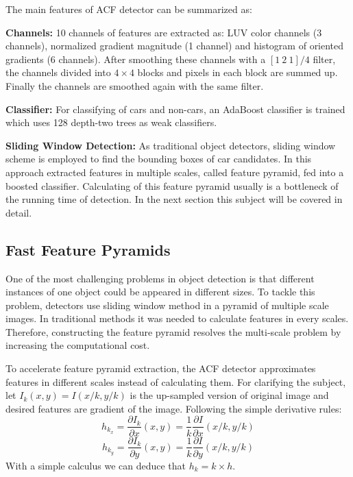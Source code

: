 \documentclass[conference]{IEEEtran}
\begin{document}
The main features of ACF detector can be summarized as:

\textbf{Channels:} 
 10 channels of features are extracted as: LUV color channels (3 channels), normalized gradient magnitude (1 channel) and histogram of oriented gradients (6 channels). After smoothing these channels with a 
$[1\ 2\ 1]/4$ filter, 
the channels divided into $4 \times 4$ blocks and pixels in each block are summed up. Finally the channels are smoothed again with the same filter.

\textbf{Classifier:} For classifying of cars and non-cars, an AdaBoost classifier \cite{friedman2000additive} is trained which uses 128 depth-two trees as weak classifiers.

\textbf{Sliding Window Detection:} As traditional object detectors, sliding window scheme is employed to find the bounding boxes of car candidates. In this approach extracted features in multiple scales, called feature pyramid, fed into a boosted classifier. Calculating of this feature pyramid usually is a bottleneck of the running time of detection. In the next section this subject will be covered in detail.

\subsection{Fast Feature Pyramids}
One of the most challenging problems in object detection is that different instances of one object could be appeared in different sizes. To tackle this problem, detectors use sliding window method in a pyramid of multiple scale images. In traditional methods it was needed to calculate features in every scales. Therefore, constructing the feature pyramid  resolves the multi-scale problem by increasing the computational cost.

 To accelerate feature pyramid extraction, the ACF detector approximates features in different scales instead of calculating them. For clarifying the subject, let $I_{k}(x,y)=I(x/k,y/k)$ is the up-sampled version of original image and desired features are gradient of the image. Following the simple derivative rules:
  $$h_{k_x} = \frac{\partial I_k}{\partial x}(x,y)=\frac{1}{k}\frac{\partial I}{\partial x}(x/k,y/k)$$ $$h_{k_y} = \frac{\partial I_k}{\partial y}(x,y)=\frac{1}{k}\frac{\partial I}{\partial y}(x/k,y/k)$$ With a simple calculus we can deduce that $h_k=k\times h$.
  
\end{document}
